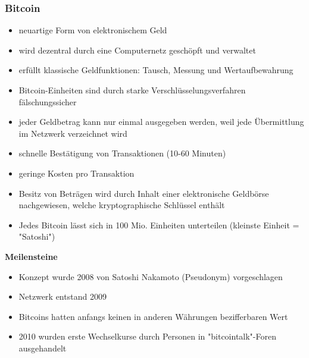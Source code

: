 \subsubsection{Bitcoin}
\begin{itemize}
	\item neuartige Form von elektronischem Geld
	\item wird dezentral durch eine Computernetz geschöpft und verwaltet
	\item erfüllt klassische Geldfunktionen: Tausch, Messung und Wertaufbewahrung
	\item Bitcoin-Einheiten sind durch starke Verschlüsselungsverfahren fälschungssicher
	\item jeder Geldbetrag kann nur einmal ausgegeben werden, weil jede Übermittlung im Netzwerk verzeichnet wird
	\item schnelle Bestätigung von Transaktionen (10-60 Minuten)
	\item geringe Kosten pro Transaktion
	\item Besitz von Beträgen wird durch Inhalt einer elektronische Geldbörse nachgewiesen, welche kryptographische Schlüssel enthält
	\item Jedes Bitcoin lässt sich in 100 Mio. Einheiten unterteilen (kleinste Einheit = "Satoshi")
\end{itemize}
\vspace{\baselineskip}
\textbf{Meilensteine}
\begin{itemize}
	\item Konzept wurde 2008 von Satoshi Nakamoto (Pseudonym) vorgeschlagen
	\item Netzwerk entstand 2009
	\item Bitcoins hatten anfangs keinen in anderen Währungen bezifferbaren Wert
	\item 2010 wurden erste Wechselkurse durch Personen in "bitcointalk"-Foren ausgehandelt
\end{itemize}
